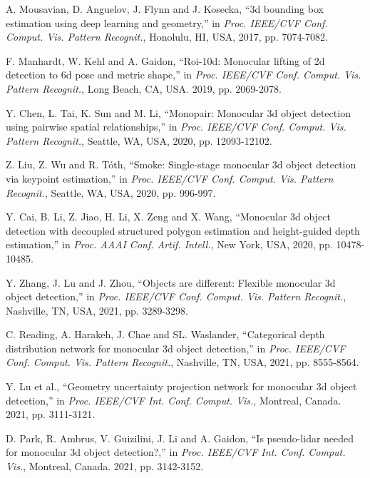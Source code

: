 \documentclass[journal]{IEEEtran}
\begin{document}
	\begin{thebibliography}{1}
			
		A. Mousavian, D. Anguelov, J. Flynn and J. Kosecka, “3d bounding box estimation using deep learning and geometry,” in \textit{Proc. IEEE/CVF Conf. Comput. Vis. Pattern Recognit.}, Honolulu, HI, USA, 2017, pp. 7074-7082.
		
		F. Manhardt, W. Kehl and A. Gaidon, “Roi-10d: Monocular lifting of 2d detection to 6d pose and metric shape,” in \textit{Proc. IEEE/CVF Conf. Comput. Vis. Pattern Recognit.}, Long Beach, CA, USA. 2019, pp. 2069-2078.
		
		Y. Chen, L. Tai, K. Sun and M. Li, “Monopair: Monocular 3d object detection using pairwise spatial relationships,” in \textit{Proc. IEEE/CVF Conf. Comput. Vis. Pattern Recognit.}, Seattle, WA, USA, 2020, pp. 12093-12102.
		
		Z. Liu, Z. Wu and R. Tóth, “Smoke: Single-stage monocular 3d object detection via keypoint estimation,” in \textit{Proc. IEEE/CVF Conf. Comput. Vis. Pattern Recognit.}, Seattle, WA, USA, 2020, pp. 996-997.
		
		Y. Cai, B. Li, Z. Jiao, H. Li, X. Zeng and X. Wang, “Monocular 3d object detection with decoupled structured polygon estimation and height-guided depth estimation,” in \textit{Proc. AAAI Conf. Artif. Intell.}, New York, USA, 2020, pp. 10478-10485.
		
		Y. Zhang, J. Lu and J. Zhou, “Objects are different: Flexible monocular 3d object detection,” in \textit{Proc. IEEE/CVF Conf. Comput. Vis. Pattern Recognit.}, Nashville, TN, USA, 2021, pp. 3289-3298.
		
		C. Reading, A. Harakeh, J. Chae and SL. Waslander, “Categorical depth distribution network for monocular 3d object detection,” in \textit{Proc. IEEE/CVF Conf. Comput. Vis. Pattern Recognit.}, Nashville, TN, USA, 2021, pp. 8555-8564.
		
		Y. Lu et al., “Geometry uncertainty projection network for monocular 3d object detection,” in \textit{Proc. IEEE/CVF Int. Conf. Comput. Vis.}, Montreal, Canada. 2021, pp. 3111-3121.
		
		D. Park, R. Ambrus, V. Guizilini, J. Li and A. Gaidon, “Is pseudo-lidar needed for monocular 3d object detection?,” in \textit{Proc. IEEE/CVF Int. Conf. Comput. Vis.}, Montreal, Canada. 2021, pp. 3142-3152.
		

\end{thebibliography}
\end{document}
